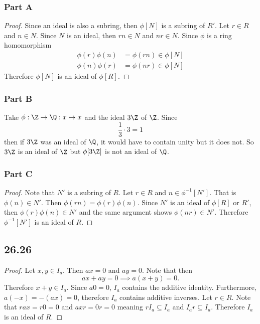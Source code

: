 \documentclass[12pt,titlepage]{extarticle}
\begin{document}
\subsubsection*{Part A}
\begin{proof}
    Since an ideal is also a subring, then $\phi[N]$ is a subring of $R'$. Let $r \in R$ and $n \in N$. Since $N$ is an ideal, then $rn \in N$ and $nr \in N$. Since $\phi$ is a ring homomorphism
    \begin{align*}
        \phi(r) \phi(n) &= \phi(rn) \in \phi[N] \\
        \phi(n) \phi(r) &= \phi(nr) \in \phi[N]
    \end{align*}
    Therefore $\phi[N]$ is an ideal of $\phi[R]$.
\end{proof}

\subsubsection*{Part B}
Take $\phi : \Z \to \Q : x \mapsto x$ and the ideal $3 \Z$ of $\Z$. Since 
\[
    \frac{1}{3} \cdot 3 = 1
\]
then if $3 \Z$ was an ideal of $\Q$, it would have to contain unity but it does not. So $3 \Z$ is an ideal of $\Z$ but $\phi[3 \Z]$ is not an ideal of $\Q$.

\subsubsection*{Part C}
\begin{proof}
    Note that $N'$ is a subring of $R$. Let $r \in R$ and $n \in \phi^{-1}[N']$. That is $\phi(n) \in N'$. Then $\phi(rn) = \phi(r) \phi(n)$. Since $N'$ is an ideal of $\phi[R]$ or $R'$, then $\phi(r) \phi(n) \in N'$ and the same argument shows $\phi(nr) \in N'$. Therefore $\phi^{-1}[N']$ is an ideal of $R$.
\end{proof}

\subsection*{26.26}
\begin{proof}
    Let $x,y \in I_a$. Then $ax = 0$ and $ay = 0$. Note that then
    \[
        ax + ay = 0 \implies a(x + y) = 0
    .\]
    Therefore $x + y \in I_a$. Since $a0 = 0$, $I_a$ contains the additive identity. Furthermore, $a(-x) = -(ax) = 0$, therefore $I_a$ contains additive inverses. Let $r \in R$. Note that $rax = r 0 = 0$ and $axr = 0 r = 0$ meaning $rI_a \subseteq I_a$ and $I_a r \subseteq I_a$. Therefore $I_a$ is an ideal of $R$.
\end{proof}
\end{document}
